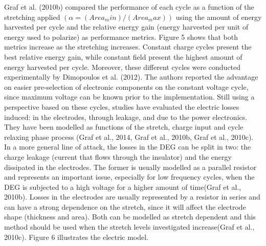Graf et al. (2010b) compared the performance of each cycle as a function of the stretching applied $(α=(Area_min)/(Area_max )) $ using the amount of energy harvested per cycle and the relative energy gain (energy harvested per unit of energy used to polarize) as performance metrics. Figure 5 shows that both metrics increase as the stretching increases. Constant charge cycles present the best relative energy gain, while constant field present the highest amount of energy harvested per cycle. Moreover, these different cycles were conducted experimentally by Dimopoulos et al. (2012). The authors reported the advantage on easier pre-selection of electronic components on the constant voltage cycle, since maximum voltage can be known prior to the implementation.
	Still using a perspective based on these cycles, studies have evaluated the electric losses induced: in the electrodes, through leakage, and due to the power electronics. They have been modelled as functions of the stretch, charge input and cycle relaxing phase process (Graf et al., 2014, Graf et al., 2010b, Graf et al., 2010c). In a more general line of attack, the losses in the DEG can be split in two: the charge leakage (current that flows through the insulator) and the energy dissipated in the electrodes. The former is usually modelled as a parallel resistor and represents an important issue, especially for low frequency cycles, when the DEG is subjected to a high voltage for a higher amount of time(Graf et al., 2010b). Losses in the electrodes are usually represented by a resistor in series and can have a strong dependence on the stretch, since it will affect the electrode shape (thickness and area). Both can be modelled as stretch dependent and this method should be used when the stretch levels investigated increase(Graf et al., 2010c). Figure 6 illustrates the electric model.
 

